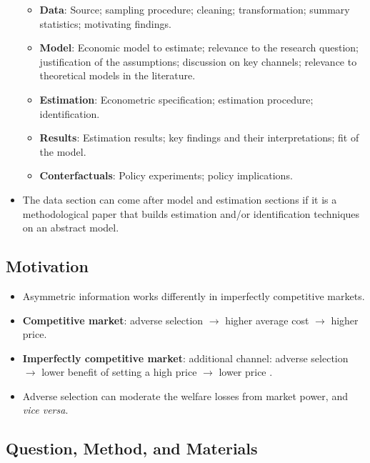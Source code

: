 \documentclass[
]{book}
\providecommand{\tightlist}{%
  \setlength{\itemsep}{0pt}\setlength{\parskip}{0pt}}
\begin{document}
\begin{itemize}
  \begin{itemize}
  \tightlist
  \item
    \textbf{Data}: Source; sampling procedure; cleaning; transformation; summary statistics; motivating findings.
  \item
    \textbf{Model}: Economic model to estimate; relevance to the research question; justification of the assumptions; discussion on key channels; relevance to theoretical models in the literature.
  \item
    \textbf{Estimation}: Econometric specification; estimation procedure; identification.
  \item
    \textbf{Results}: Estimation results; key findings and their interpretations; fit of the model.
  \item
    \textbf{Conterfactuals}: Policy experiments; policy implications.
  \end{itemize}
\item
  The data section can come after model and estimation sections if it is a methodological paper that builds estimation and/or identification techniques on an abstract model.
\end{itemize}

\hypertarget{motivation}{%
\subsection{Motivation}\label{motivation}}

\begin{itemize}
\tightlist
\item
  Asymmetric information works differently in imperfectly competitive markets.
\item
  \textbf{Competitive market}: adverse selection \(\to\) higher average cost \(\to\) higher price.
\item
  \textbf{Imperfectly competitive market}: additional channel: adverse selection \(\to\) lower benefit of setting a high price \(\to\) lower price \citep{mahoneyImperfectCompetitionSelection2017, lesterScreeningAdverseSelection2018}.
\item
  Adverse selection can moderate the welfare losses from market power, and \emph{vice versa}.
\end{itemize}

\hypertarget{question-method-and-materials}{%
\subsection{Question, Method, and Materials}\label{question-method-and-materials}}
\end{document}
